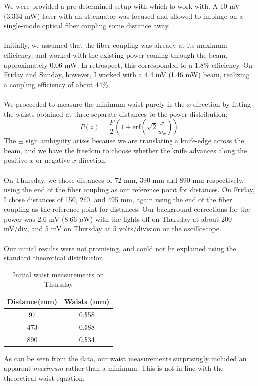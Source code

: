 \documentclass[10pt,a4paper]{article}
\begin{document}
We were provided a pre-determined setup with which to work with. A 10 mV (3.334 mW) laser with an attenuator was focused and allowed to impinge on a single-mode optical fiber coupling some distance away. \\
\\
Initially, we assumed that the fiber coupling was already at its maximum efficiency, and worked with the existing power coming through the beam, approximately 0.06 mW. In retrospect, this corresponded to a 1.8\% efficiency. On Friday and Sunday, however, I worked with a 4.4 mV (1.46 mW) beam, realizing a coupling efficiency of about 44\%.\\
\\
We proceeded to measure the minimum waist purely in the $x$-direction by fitting the waists obtained at three separate distances to the power distribution:$$P(z) = \dfrac{P}{2}\left(1 \pm \mathrm{erf}\left(\sqrt{2}\dfrac{x}{w_{x}}\right)\right)$$ The $\pm$ sign ambiguity arises because we are translating a knife-edge across the beam, and we have the freedom to choose whether the knife advances along the positive $x$ or negative $x$ direction.\\
\\
On Thursday, we chose distances of 72 mm, 390 mm and 890 mm respectively, using the end of the fiber coupling as our reference point for distances. On Friday, I chose distances of 150, 260, and 495 mm, again using the end of the fiber coupling as the reference point for distances. Our background corrections for the power was 2.6 mV (8.66 $\mu$W) with the lights off on Thursday at about 200 mV/div, and 5 mV on Thursday at 5 volts/division on the oscilloscope.\\
\\
Our initial results were not promising, and could not be explained using the standard theoretical distribution.
\begin{table}[H]
\centering
\begin{tabular}{|c|c|}
 \hline 
 Distance(mm) & Waists (mm) \\ 
 \hline 
 97 & 0.558 \\ 
 \hline 
 473 & 0.588 \\
 \hline
 890 & 0.534\\
 \hline
 \end{tabular}
\caption{Initial waist measurements on Thursday}
\end{table}
As can be seen from the data, our waist measurements surprisingly included an apparent \textsl{maximum} rather than a minimum. This is not in line with the theoretical waist equation.\\
\end{document}
